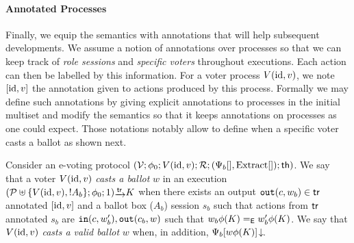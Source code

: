 





\paragraph{\textbf{Annotated Processes}}
Finally, we equip the semantics with annotations that will help subsequent developments.
We assume a notion of annotations over processes so that we can keep track of 
{\em role sessions} and {\em specific voters} throughout executions. Each action can then be labelled 
by this information. For a voter process $V(\mathrm{id},v)$, we note $[\mathrm{id},v]$ the annotation given to actions produced by this process.
Formally we may define such annotations by giving explicit annotations to processes
in the initial multiset and modify the semantics so that it keeps annotations on processes as one could
expect. Those notations notably allow to define when a specific voter casts a ballot as shown next.
\begin{definition}
  Consider an e-voting protocol
  $(\mathcal{V}; 
  \phi_0; 
  V(\mathrm{id},v);
  \mathcal{R}; 
  (\Psi_b[],\mathrm{Extract}[]);
  \mathsf{th})$.
  We say that a voter $V(\mathrm{id},v)$ {\em casts a ballot} $w$ in an execution
  $(\p\uplus\{V(\id,v),!A_b\};\phi_0;1)\sint{\tr}K$ 
  when there exists an output $\mathtt{out}(c,w_b)\in\mathsf{tr}$ annotated $[\mathrm{id},v]$ 
  and a ballot box (\ie $A_b$) session $s_b$ such that actions from $\mathsf{tr}$ annotated $s_b$ are
  $\mathtt{in}(c,w_b'),\mathtt{out}(c_b,w)$ such that $w_b\phi(K)=_{\mathsf{E}} w_b'\phi(K)$.
  We say that $V(\mathrm{id},v)$ {\em casts a valid ballot} $w$ when, in addition, $\Psi_b[w\phi(K)]\!\downarrow\!$\;.
\end{definition}

